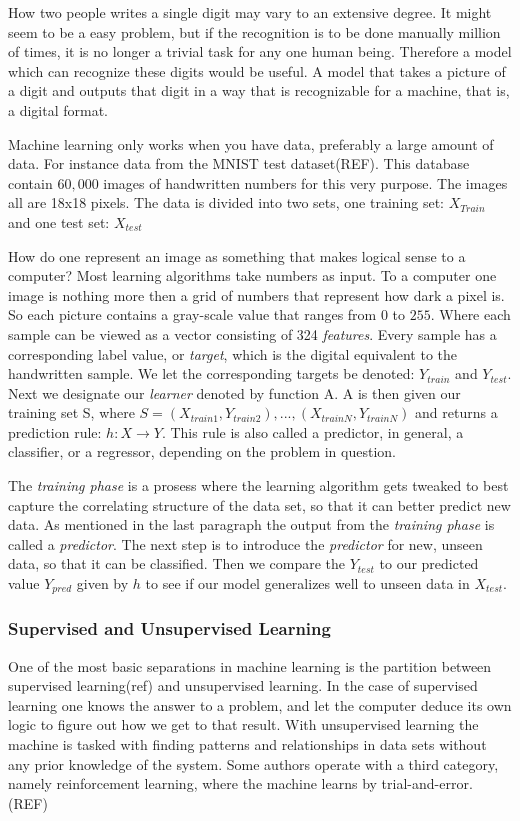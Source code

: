 	How two people writes a single digit may vary to an extensive degree. It might seem to be a easy problem, but if the recognition is to be done manually million of times, it is no longer a trivial task for any one human being. Therefore a model which can recognize these digits would be useful. A model that takes a picture of a digit and outputs that digit in a way that is recognizable for a machine, that is, a digital format.
	
	Machine learning only works when you have data, preferably a large amount of data. For instance data from the MNIST test dataset(REF). This database contain $60,000$ images of handwritten numbers for this very purpose. The images all are 18x18 pixels. The data is divided into two sets, one training set: $X_{Train}$ and one test set: $X_{test}$
	
	How do one represent an image as something that makes logical sense to a computer? Most learning algorithms take numbers as input. To a computer one image is nothing more then a grid of numbers that represent how dark a pixel is. So each picture contains a gray-scale value that ranges from $0$ to $255$. Where each sample can be viewed as a vector consisting of 324 \textit{features}. Every sample has a corresponding label value, or \textit{target}, which is the digital equivalent to the handwritten sample. We let the corresponding targets be denoted: $Y_{train}$ and $Y_{test}$. Next we designate our \textit{learner} denoted by function A. A is then given our training set S, where $S = (X_{train1}, Y_{train2}),..., (X_{trainN}, Y_{trainN})$ and returns a prediction rule: $h: X \rightarrow Y$. This rule is also called a predictor, in general, a classifier, or a regressor, depending on the problem in question. 
	
	The \textit{training phase} is a prosess where the learning algorithm gets tweaked to best capture the correlating structure of the data set, so that it can better predict new data. As mentioned in the last paragraph the output from the \textit{training phase} is called a \textit{predictor}. The next step is to introduce the \textit{predictor} for new, unseen data, so that it can be classified. Then we compare the $Y_{test}$ to our predicted value $Y_{pred}$ given by $h$ to see if our model generalizes well to unseen data in $X_{test}$. 
	
	\subsubsection{Supervised and Unsupervised Learning }
	One of the most basic separations in machine learning is the partition between supervised learning(ref) and unsupervised learning. In the case of supervised learning one knows the answer to a problem, and let the computer deduce its own logic to figure out how we get to that result. With unsupervised learning the machine is tasked with finding patterns and relationships in data sets without any prior knowledge of the system. Some authors operate with a third category, namely reinforcement learning, where the machine learns by trial-and-error. (REF)
		
